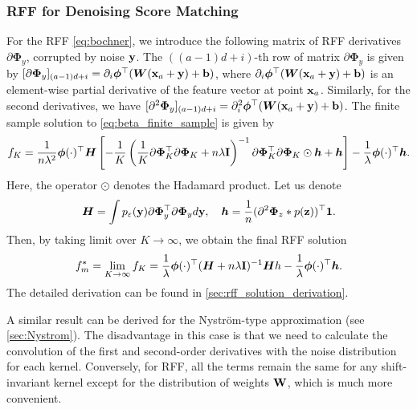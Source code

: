 \subsubsection{RFF for Denoising Score Matching}
For the RFF \eqref{eq:bochner},
we introduce the following matrix of RFF derivatives $\partial {\bm \Phi}_y$,
corrupted by noise $\bf{y}$.
The $((a - 1)d + i)$-th row of matrix $\partial {\bm \Phi}_y$ is given by
$[\partial \bm{\Phi}_y]_{(a - 1)d + i} = \partial_i \bm{\phi}^\top(\bm{W}({\bf x}_a + \bf{y}) + \bm{b})$,
where $\partial_i \bm{\phi}^\top(\bm{W}({\bf x}_a + \bf{y}) + \bm{b})$
is an element-wise partial derivative of the feature vector at point ${\bf x}_a$.
Similarly, for the second derivatives, we have
$[\partial^2 \bm{\Phi}_y]_{(a - 1)d + i} =
\partial^2_i \bm{\phi}^\top(\bm{W}({\bf x}_a + \bf{y}) + \bm{b})$.
The finite sample solution to \eqref{eq:beta_finite_sample} is given by
\[
    f_K
    = \frac{1}{n\lambda^2}{\bm \phi}(\cdot)^{\top}{\bm H}
    \left[-\frac{1}{K}\left(\frac{1}{K}\partial  {\bm \Phi}_K^{\top}\partial{\bm \Phi}_K + n\lambda {\bf I}\right)^{-1}\partial {\bm \Phi}_K^{\top}\partial{\bm \Phi}_K \odot {\bm h} + {\bm h}\right]
    -\frac{1}{\lambda} {\bm \phi}(\cdot)^{\top}{\bm h}.
\]
Here, the operator $\odot$ denotes the Hadamard product.
Let us denote
\begin{equation}
    \label{eq:h}
    {\bm H} = \int p_{\varepsilon}({\bf y})\partial{\bm \Phi}_y^{\top}\partial{\bm \Phi}_y
    d{\bf y},
    \quad
    {\bm h} = \frac{1}{n}(\partial^2 {\bm \Phi}_z * p({\bf z}))^{\top}{\bf 1}.
\end{equation}
Then, by taking limit over $K \to \infty$, we obtain the final RFF solution
\begin{equation}
\label{eq:rff_f}
    f_{m}^* = \lim\limits_{K \to \infty} f_K
    = \frac{1}{\lambda}{\bm \phi}(\cdot)^{\top}({\bm H} + n\lambda{\bf I})^{-1}{\bm Hh}
    - \frac{1}{\lambda}{\bm \phi}(\cdot)^{\top}{\bm h}.
\end{equation}
The detailed derivation can be found in \ref{sec:rff_solution_derivation}.

A similar result can be derived for the Nystr\"om-type approximation
(see \ref{sec:Nystrom}).
The disadvantage in this case is that we need to calculate
the convolution of the first and second-order derivatives with the noise distribution
for each kernel.
Conversely, for RFF, all the terms remain the same for any shift-invariant kernel
except for the distribution of weights $\bf{W}$, which is much more convenient.

